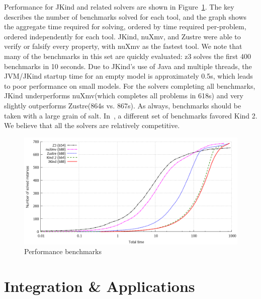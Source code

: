 \documentclass{llncs}
\newcommand{\jkind}{{\sc JKind}\xspace}
\newcommand{\kind}{{\sc Kind}\xspace}
\newcommand{\nuxmv}{{\sc nuXmv}\xspace}
\newcommand{\zustre}{{\sc Zustre}\xspace}
\newcommand{\mike}[1]{\textcolor{red}{#1}}
\begin{document}
Performance for \jkind and related solvers are shown in
Figure~\ref{fig:benchmark}. The key describes the number of benchmarks solved for each tool, and the graph shows the aggregate time required for solving, ordered by time required per-problem, ordered independently for each tool.  \jkind, \nuxmv, and
\zustre were able to verify or falsify every property, with \nuxmv as
the fastest tool.  We note that many of the benchmarks in this set are quickly evaluated: z3 solves the first 400 benchmarks in 10 seconds.  Due to \jkind's use of Java and multiple threads, the JVM/\jkind startup time for an empty model is approximately 0.5s, which leads to poor performance on small models.  For the solvers completing all benchmarks, \jkind underperforms \nuxmv (which completes all problems in 618s) and very slightly outperforms \zustre (864s vs. 867s).  As always, benchmarks should be taken with a large grain of salt.  In~\cite{champion2016cav}, a different set of benchmarks favored \kind2.  We believe that all the solvers are relatively competitive.


\begin{figure}
  \begin{center}
    \includegraphics[width=\textwidth]{graph.png}
  \end{center}
  \vspace{-2em}
  \caption{Performance benchmarks}
  \vspace{-1em}
  \label{fig:benchmark}
\end{figure}


\section{Integration \& Applications}

\end{document}
